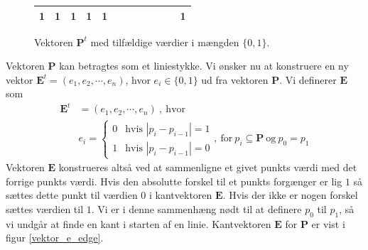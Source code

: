 {\begin{figure}[!h]
    \renewcommand{\arraystretch}{1.5}
    \centering
    \begin{tabular}{|c|c|c|c|c|c|c|c|c|c|}
        \hline
        1 & 1 & 1 & 1 & 1 & \cellcolor{black}\textcolor{white}{0} & \cellcolor{black}\textcolor{white}{0} & \cellcolor{black}\textcolor{white}{0} & \cellcolor{black}\textcolor{white}{0} & 1\\\hline
    \end{tabular}
    \caption[]{Vektoren $\mathbf{P}^t$ med tilfældige værdier i mængden
    $\{0,1\}$.}
    \label{vektor_p_edge}
\end{figure}
Vektoren $\mathbf{P}$ kan betragtes som et liniestykke. Vi ønsker nu at
konstruere en ny vektor $\mathbf{E}^t = (e_1, e_2, \cdots, e_n)$, hvor
$e_i \in \{0,1\}$ ud fra vektoren $\mathbf{P}$. Vi definerer
$\mathbf{E}$ som
\begin{equation}
    \begin{split}
        \mathbf{E}^t &= (e_1, e_2, \cdots, e_n) \mathrm{~,~hvor~} \\
        &e_i = \left\{
        \begin{array}{rl}
            0 & \text{hvis~} |p_i - p_{i - 1}| = 1\\
            1 & \text{hvis~} |p_i - p_{i - 1}| = 0
        \end{array} \right. \mathrm{,~for~} p_i \subseteq \mathbf{P}
        \mathrm{~og~} p_0 = p_1
    \end{split}
    \label{vektor_e_bin}
\end{equation}
Vektoren $\mathbf{E}$ konstrueres altså ved at sammenligne et givet
punkts værdi med det forrige punkts værdi. Hvis den absolutte forskel
til et punkts forgænger er lig $1$ så sættes dette punkt til værdien $0$
i kantvektoren $\mathbf{E}$. Hvis der ikke er nogen forskel sættes værdien til
$1$. Vi er i denne sammenhæng nødt til at definere $p_0$ til $p_1$, så
vi undgår at finde en kant i starten af en linie. Kantvektoren
$\mathbf{E}$ for $\mathbf{P}$ er vist i figur \ref{vektor_e_edge}.

}
